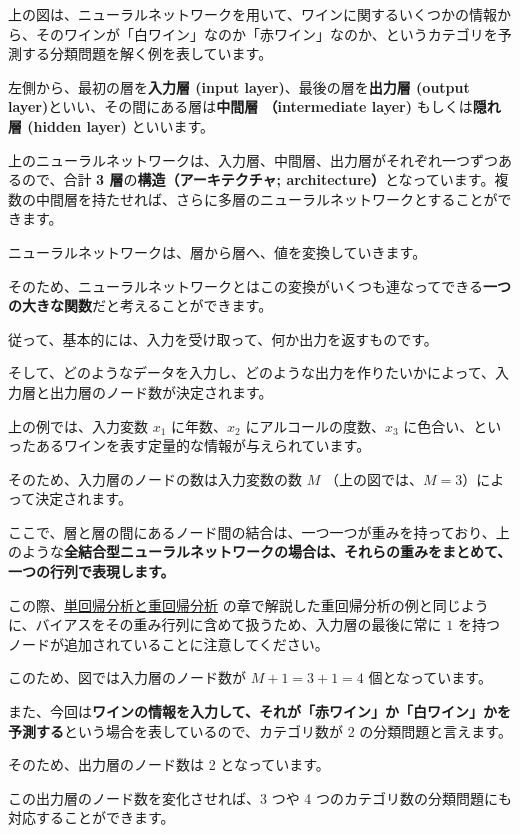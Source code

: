 上の図は、ニューラルネットワークを用いて、ワインに関するいくつかの情報から、そのワインが「白ワイン」なのか「赤ワイン」なのか、というカテゴリを予測する分類問題を解く例を表しています。


左側から、最初の層を\textbf{入力層 (input layer)}、最後の層を\textbf{出力層 (output layer)}といい、その間にある層は\textbf{中間層 （intermediate layer)} もしくは\textbf{隠れ層 (hidden layer)} といいます。

上のニューラルネットワークは、入力層、中間層、出力層がそれぞれ一つずつあるので、合計 \textbf{3 層}の\textbf{構造（アーキテクチャ; architecture）}となっています。複数の中間層を持たせれば、さらに多層のニューラルネットワークとすることができます。


ニューラルネットワークは、層から層へ、値を変換していきます。

そのため、ニューラルネットワークとはこの変換がいくつも連なってできる\textbf{一つの大きな関数}だと考えることができます。

従って、基本的には、入力を受け取って、何か出力を返すものです。

そして、どのようなデータを入力し、どのような出力を作りたいかによって、入力層と出力層のノード数が決定されます。


上の例では、入力変数 $x_1$ に年数、$x_2$ にアルコールの度数、$x_3$ に色合い、といったあるワインを表す定量的な情報が与えられています。

そのため、入力層のノードの数は入力変数の数 $M$ （上の図では、$M = 3$）によって決定されます。

ここで、層と層の間にあるノード間の結合は、一つ一つが重みを持っており、上のような\textbf{全結合型ニューラルネットワークの場合は、それらの重みをまとめて、一つの行列で表現します。}

この際、\href{https://tutorials.chainer.org/ja/07_Regression_Analysis.html}{単回帰分析と重回帰分析} の章で解説した重回帰分析の例と同じように、バイアスをその重み行列に含めて扱うため、入力層の最後に常に $1$ を持つノードが追加されていることに注意してください。

このため、図では入力層のノード数が $M + 1 = 3 + 1 = 4$ 個となっています。


また、今回は\textbf{ワインの情報を入力して、それが「赤ワイン」か「白ワイン」かを予測する}という場合を表しているので、カテゴリ数が 2 の分類問題と言えます。

そのため、出力層のノード数は 2 となっています。

この出力層のノード数を変化させれば、3 つや 4 つのカテゴリ数の分類問題にも対応することができます。

